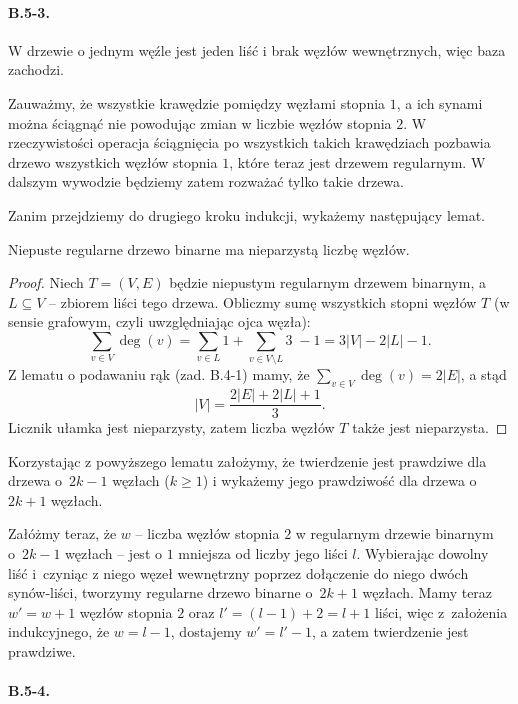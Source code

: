 \paragraph{B.5-3.}
W drzewie o jednym węźle jest jeden liść i brak węzłów wewnętrznych, więc baza zachodzi.

Zauważmy, że wszystkie krawędzie pomiędzy węzłami stopnia $1$, a ich synami można ściągnąć nie powodując zmian w liczbie węzłów stopnia $2$. W rzeczywistości operacja ściągnięcia po wszystkich takich krawędziach pozbawia drzewo wszystkich węzłów stopnia $1$, które teraz jest drzewem regularnym. W dalszym wywodzie będziemy zatem rozważać tylko takie drzewa.

Zanim przejdziemy do drugiego kroku indukcji, wykażemy następujący lemat.
\begin{lemat*}
	Niepuste regularne drzewo binarne ma nieparzystą liczbę węzłów.
\end{lemat*}
\begin{proof}
Niech $T=(V,E)$ będzie niepustym regularnym drzewem binarnym, a~$L\subseteq V$ -- zbiorem liści tego drzewa. Obliczmy sumę wszystkich stopni węzłów $T$ (w sensie grafowym, czyli uwzględniając ojca węzła):
\[
	\sum_{v\in V}\deg(v) = \sum_{v\in L}1+\sum_{v\in V\setminus L}3\;-1=3|V|-2|L|-1.
\]
Z lematu o podawaniu rąk (zad. B.4-1) mamy, że $\sum_{v\in V}\deg(v) = 2|E|$, a stąd
\[
	|V| = \frac{2|E|+2|L|+1}{3}.
\]
Licznik ułamka jest nieparzysty, zatem liczba węzłów $T$ także jest nieparzysta.

\end{proof}

Korzystając z powyższego lematu założymy, że twierdzenie jest prawdziwe dla drzewa o~$2k-1$ węzłach ($k\ge 1$) i wykażemy jego prawdziwość dla drzewa o $2k+1$ węzłach.

Załóżmy teraz, że $w$ -- liczba węzłów stopnia $2$ w regularnym drzewie binarnym o~$2k-1$ węzłach -- jest o $1$ mniejsza od liczby jego liści $l$. Wybierając dowolny liść i~czyniąc z niego węzeł wewnętrzny poprzez dołączenie do niego dwóch synów-liści, tworzymy regularne drzewo binarne o~$2k+1$ węzłach. Mamy teraz $w'=w+1$ węzłów stopnia $2$ oraz $l'=(l-1)+2=l+1$ liści, więc z~założenia indukcyjnego, że $w=l-1$, dostajemy $w'=l'-1$, a zatem twierdzenie jest prawdziwe.

\paragraph{B.5-4.}
% 
% 


